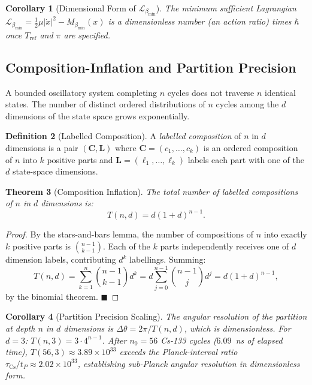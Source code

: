 \documentclass[12pt, a4paper]{article}
\theoremstyle{plain}
\newtheorem{theorem}{Theorem}[section]
\newtheorem{corollary}[theorem]{Corollary}
\theoremstyle{definition}
\newtheorem{definition}[theorem]{Definition}
\theoremstyle{remark}
\newcommand{\bmin}{\beta_{\min}}
\newcommand{\Lmin}{\mathcal{L}_{\bmin}}
\newcommand{\half}{\tfrac{1}{2}}
\newcommand{\qed}{\hfill$\blacksquare$}
\begin{document}
\begin{corollary}[Dimensional Form of $\Lmin$]
\label{cor:dimlessL}
The minimum sufficient Lagrangian $\Lmin = \half\mu|\dot{x}|^2 - M_{\bmin}(x)$
is a dimensionless number (an action ratio) times $\hbar$ once $T_{\mathrm{ref}}$
and $\pi$ are specified.
\end{corollary}

\subsection{Composition-Inflation and Partition Precision}

A bounded oscillatory system completing $n$ cycles does not traverse $n$
identical states. The number of distinct ordered distributions of $n$ cycles
among the $d$ dimensions of the state space grows exponentially.

\begin{definition}[Labelled Composition]
A \emph{labelled composition} of $n$ in $d$ dimensions is a pair $(\mathbf{C},
\mathbf{L})$ where $\mathbf{C} = (c_1, \ldots, c_k)$ is an ordered composition
of $n$ into $k$ positive parts and $\mathbf{L} = (\ell_1, \ldots, \ell_k)$
labels each part with one of the $d$ state-space dimensions.
\end{definition}

\begin{theorem}[Composition Inflation]
\label{thm:composition}
The total number of labelled compositions of $n$ in $d$ dimensions is:
\[
  T(n, d) = d(1 + d)^{n-1}.
\]
\end{theorem}

\begin{proof}
By the stars-and-bars lemma, the number of compositions of $n$ into exactly $k$
positive parts is $\binom{n-1}{k-1}$. Each of the $k$ parts independently
receives one of $d$ dimension labels, contributing $d^k$ labellings. Summing:
\[
  T(n, d) = \sum_{k=1}^{n}\binom{n-1}{k-1}d^k
  = d\sum_{j=0}^{n-1}\binom{n-1}{j}d^j = d(1+d)^{n-1},
\]
by the binomial theorem. \qed
\end{proof}

\begin{corollary}[Partition Precision Scaling]
\label{cor:precision}
The angular resolution of the partition at depth $n$ in $d$ dimensions is
$\Delta\theta = 2\pi/T(n,d)$, which is dimensionless. For $d = 3$:
$T(n,3) = 3\cdot 4^{n-1}$. After $n_0 = 56$ Cs-133 cycles ($6.09$~ns of elapsed
time), $T(56,3) \approx 3.89 \times 10^{33}$ exceeds the Planck-interval ratio
$\tau_{\mathrm{Cs}}/t_P \approx 2.02\times 10^{33}$, establishing sub-Planck
angular resolution in dimensionless form.
\end{corollary}
\end{document}
